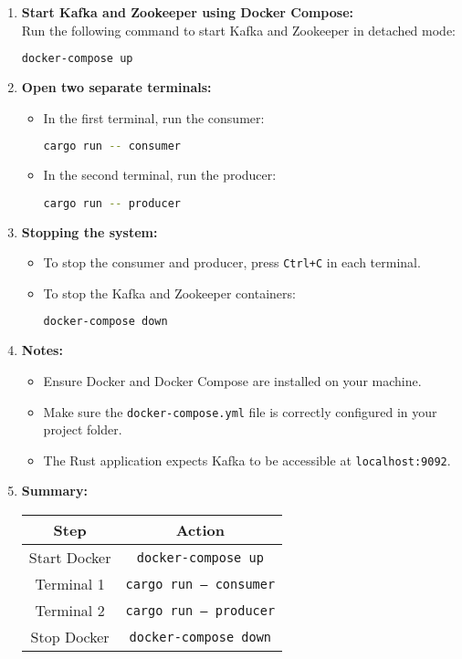\begin{enumerate}
	\item \textbf{Start Kafka and Zookeeper using Docker Compose:} \\
	Run the following command to start Kafka and Zookeeper in detached mode:
	\begin{lstlisting}[language=bash]
		docker-compose up
	\end{lstlisting}
	
	\item \textbf{Open two separate terminals:}
	\begin{itemize}
		\item In the first terminal, run the consumer:
		\begin{lstlisting}[language=bash]
			cargo run -- consumer
		\end{lstlisting}
		\item In the second terminal, run the producer:
		\begin{lstlisting}[language=bash]
			cargo run -- producer
		\end{lstlisting}
	\end{itemize}
	
	\item \textbf{Stopping the system:}
	\begin{itemize}
		\item To stop the consumer and producer, press \texttt{Ctrl+C} in each terminal.
		\item To stop the Kafka and Zookeeper containers:
		\begin{lstlisting}[language=bash]
			docker-compose down
		\end{lstlisting}
	\end{itemize}
	
	\item \textbf{Notes:}
	\begin{itemize}
		\item Ensure Docker and Docker Compose are installed on your machine.
		\item Make sure the \texttt{docker-compose.yml} file is correctly configured in your project folder.
		\item The Rust application expects Kafka to be accessible at \texttt{localhost:9092}.
	\end{itemize}
	
	\item \textbf{Summary:}
	
	\begin{tabular}{|c|c|}
		\hline
		\textbf{Step} & \textbf{Action} \\
		\hline
		Start Docker & \texttt{docker-compose up} \\
		\hline
		Terminal 1 & \texttt{cargo run -- consumer} \\
		\hline
		Terminal 2 & \texttt{cargo run -- producer} \\
		\hline
		Stop Docker & \texttt{docker-compose down} \\
		\hline
	\end{tabular}
\end{enumerate}


